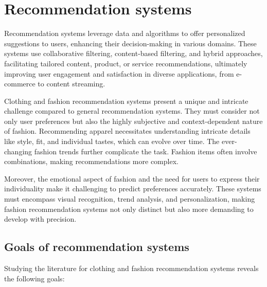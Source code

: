 \section{Recommendation systems} \label{section:rs}
	Recommendation systems leverage data and algorithms to offer personalized suggestions to users, enhancing their decision-making in various domains. These systems use collaborative filtering, content-based filtering, and hybrid approaches, facilitating tailored content, product, or service recommendations, ultimately improving user engagement and satisfaction in diverse applications, from e-commerce to content streaming.

	Clothing and fashion recommendation systems present a unique and intricate challenge compared to general recommendation systems. They must consider not only user preferences but also the highly subjective and context-dependent nature of fashion. Recommending apparel necessitates understanding intricate details like style, fit, and individual tastes, which can evolve over time. The ever-changing fashion trends further complicate the task. Fashion items often involve combinations, making recommendations more complex.

	Moreover, the emotional aspect of fashion and the need for users to express their individuality make it challenging to predict preferences accurately. These systems must encompass visual recognition, trend analysis, and personalization, making fashion recommendation systems not only distinct but also more demanding to develop with precision.

	\subsection{Goals of recommendation systems}
		Studying the literature for clothing and fashion recommendation systems reveals the following goals:

